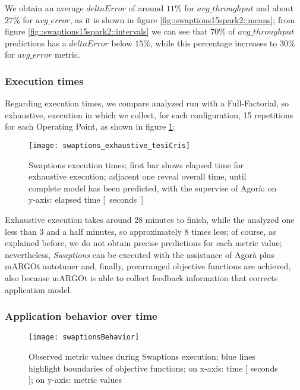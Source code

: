 We obtain an average $deltaError$ of around $11\%$ for $avg\_throughput$ and about $27\%$ for $avg\_error$, as it is shown in figure \ref{fig::swaptions15spark2::means}; from figure \ref{fig::swaptions15spark2::intervals} we can see that $70\%$ of $avg\_throughput$ predictions has a $deltaError$ below $15\%$, while this percentage increases to $30\%$ for $avg\_error$ metric.


\subsubsection{Execution times}

Regarding execution times, we compare analyzed run with a Full-Factorial, so exhaustive, execution in which we collect, for each configuration, 15 repetitions for each Operating Point, as shown in figure \ref{fig::sw::execT}:

\begin{figure}[h]

    \centering
    
    \texttt{[image: swaptions\_exhaustive\_tesiCris]}
    
    \caption[Swaptions execution times]{Swaptions execution times; first bar shows elapsed time for exhaustive execution; adjacent one reveal overall time, until complete model has been predicted, with the supervise of Agorà; on y-axis: elapsed time \hbox{[ seconds ]}}
    
    \label{fig::sw::execT}
    
\end{figure}

Exhaustive execution takes around 28 minutes to finish, while the analyzed one less than 3 and a half minutes, so approximately 8 times less; of course, as explained before, we do not obtain precise predictions for each metric value; nevertheless, \textit{Swaptions} can be executed with the assistance of Agorà plus mARGOt autotuner and, finally, prearranged objective functions are achieved, also because mARGOt is able to collect feedback information that corrects application model.


\subsubsection{Application behavior over time}

\begin{figure}[h]

    \centering
    
    \texttt{[image: swaptionsBehavior]}
    
    \caption[Observed metric values during Swaptions execution]{Observed metric values during Swaptions execution; blue lines highlight boundaries of objective functions; on x-axis: time [ seconds ]; on y-axis: metric values}
    
    \label{fig::sw::beh}
    
\end{figure}

